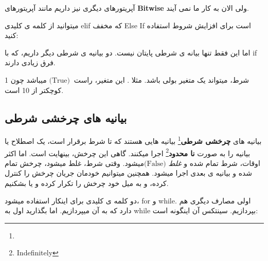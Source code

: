 \documentclass[14pt,a4paper]{memoir}
\begin{document}
	 
	 
	 آپریتورهای دیگری نیز داریم مانند آپریتورهای \textbf{Bitwise} ولی الان به کار ما نمی آیند.
	 
	 میتوانید از کلمه ی کلیدی elif که مخفف Else If است برای افزایش شروط استفاده کنید:
	 
	 
	 \begin{latin}
	 
\end{latin}

اما این فقط تنها بیانه ی شرطی پایتان نیست. دو بیانیه ی شرطی دیگر داریم، که با if فرق زیادی دارند.



\begin{tip}
	شرط، میتواند یک متغیر بولی باشد. مثلا . این متغیر، راست $\text{(True)}\ $ میباشد چون 1 کوچکتر از 10 است.
\end{tip}


\subsection{بیانیه های چرخشی شرطی}\label{pyloops}
	 
	 بیانیه های \textbf{چرخشی شرطی}\footnote{} بیانیه هایی هستند که تا شرط برقرار است، یک اصطلاح یا بیانیه را به صورت \textbf{نا محدود}\footnote{Indefinitely} اجرا میکنند. گاهی این چرخش، بینهایت است. اما اکثر اوقات، شرط تمام شده و \textit{غلط} $\text{(False)}  $میشود. وقتی شرط، غلط میشود، چرخش تمام شده و بیانیه ی بعدی اجرا میشود. همچنین میتوانیم خودمان جریان چرخش را کنترل کرده، و به میل خود چرخش را تکرار کرده و یا بشکنیم.
	 
	 دو کلمه ی کلیدی برای اینکار استفاده میشود، for و while. اولی مصارف دیگری هم دارد که به آن میپردازیم. اما بگذارید اول به while بپردازیم. سینتکس آن اینگونه است:
	 
	 
	 
	 
	 \begin{latin}
	
\end{latin}
	 
\end{document}
